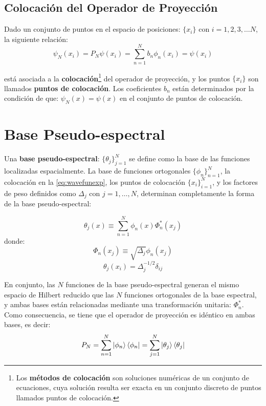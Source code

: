 \subsection{Colocación del Operador de Proyección}
Dado un conjunto de puntos en el espacio de posiciones: $\{x_i\}$ con $i=1,2,3,\dots N$, la siguiente relación:
\begin{equation}
  \label{eq:wavefunexp}
  \psi_N(x_i) = P_N\psi(x_i)=\sum_{n=1}^{N}b_n\phi_n(x_i) = \psi(x_i)
\end{equation}

está asociada a la \textbf{colocación}\footnote{Los \textbf{métodos de colocación} son soluciones numéricas de un conjunto de ecuaciones, cuya solución resulta ser exacta en un conjunto discreto de puntos llamados puntos de colocación.\cite{Tannor:2006}} del operador de proyección, y los puntos $\{x_i\}$ son llamados \textbf{puntos de colocación}. Los coeficientes $b_n$ están determinados por la condición de que: $\psi_N(x)=\psi(x)$ en el conjunto de puntos de colocación.


\section{Base Pseudo-espectral}
Una \textbf{base pseudo-espectral}: $\{\theta_j\}_{j=1}^N$ se define como la base de las funciones localizadas espacialmente. La base de funciones ortogonales $\{\phi_n\}_{n=1}^N$, la colocación en la \autoref{eq:wavefunexp}, los puntos de colocación $\{x_i\}_{i=1}^N$, y los factores de peso definidos como $\Delta_j$ con $j=1,\dots,N$, determinan completamente la forma de la base pseudo-espectral:

\begin{equation}
  \label{eq:basepseudo}
  \theta_j(x) \equiv \sum_{n=1}^N\phi_n(x)\Phi_n^*(x_j)
\end{equation}
donde:
$$\Phi_n(x_j)\equiv \sqrt{\Delta_j}\phi_n(x_j)$$
$$\theta_j(x_i) = \Delta_j^{-1/2}\delta_{ij}$$


En conjunto, las $N$ funciones de la base pseudo-espectral generan el mismo espacio de Hilbert reducido que las $N$ funciones ortogonales de la base espectral, y ambas bases están relacionadas mediante una transformación unitaria: $\Phi_n^*$. Como consecuencia, se tiene que el operador de proyección es idéntico en ambas bases, es decir:
\begin{equation}
  \label{eq:proyecbases}
  P_N = \sum_{n=1}^N\ket{\phi_n}\bra{\phi_n}=\sum_{j=1}^N\ket{\theta_j}\bra{\theta_j}
\end{equation}

